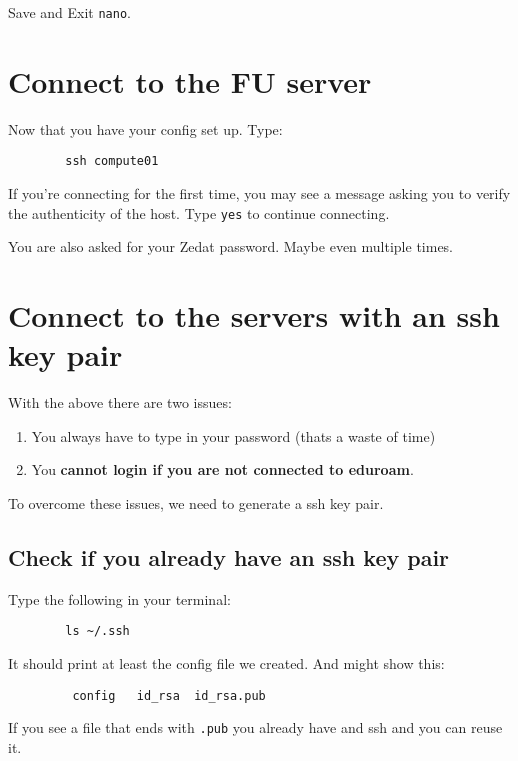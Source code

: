 \documentclass{article}
\begin{document}
	Save and Exit \verb|nano|.
	
	\section{Connect to the FU server}
	
	Now that you have your config set up. Type:
	
	\begin{verbatim}
		ssh compute01
	\end{verbatim}
	
	If you're connecting for the first time, you may see a message asking you to verify the authenticity of the host. Type \texttt{yes} to continue connecting.
	
	You are also asked for your Zedat password. Maybe even multiple times.
	
	\section{Connect to the servers with an ssh key pair}
	
	With the above there are two issues:
	
	\begin{enumerate}
		\item You always have to type in your password (thats a waste of time)
		\item You \textbf{cannot login if you are not connected to eduroam}.	
	\end{enumerate}
	
	To overcome these issues, we need to generate a ssh key pair.
	
	\subsection{Check if you already have an ssh key pair}
	
	Type the following in your terminal:
	
	\begin{verbatim}
		ls ~/.ssh
	\end{verbatim}
	
	It should print at least the config file we created. And might show this:
	
	\begin{verbatim}
		 config   id_rsa  id_rsa.pub
	\end{verbatim}
	
	If you see a file that ends with \verb|.pub| you already have and ssh and you can reuse it.
	
\end{document}
